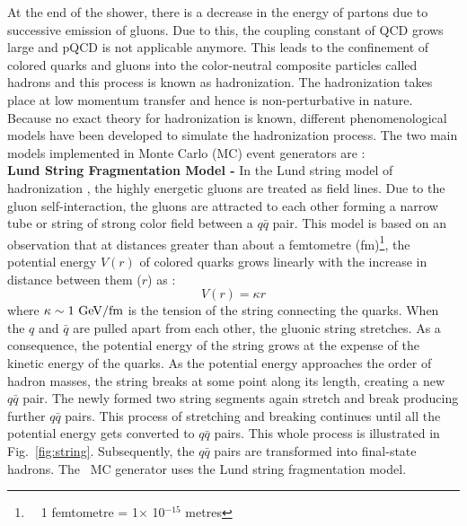 At the end of the shower, there is a decrease in the energy of partons due to successive emission of gluons. Due to this, the coupling constant of QCD \alps grows large and pQCD is not applicable anymore. This leads to the confinement of colored quarks and gluons into the color-neutral composite particles called hadrons and this process is known as hadronization. The hadronization takes place at low momentum transfer and hence is non-perturbative in nature. Because no exact theory for hadronization is known, different phenomenological models have been developed to simulate the hadronization process. The two main models implemented in Monte Carlo (MC) event generators are : \\\newline
{\bf Lund String Fragmentation Model -} In the Lund string model of hadronization \cite{Andersson:1998tv}, the highly energetic gluons are treated as field lines. Due to the gluon self-interaction, the gluons are attracted to each other forming a narrow tube or string of strong color field between a $q\bar{q}$ pair. This model is based on an observation that at distances greater than about a femtometre (fm)\footnote{~~1 femtometre = 1$\times$ 10$^{-15}$ metres}, the potential energy $V(r)$ of colored quarks grows linearly with the increase in distance between them ($r$) as :
\begin{equation}
V(r) = \kappa r
\end{equation}
where $\kappa \sim 1~{\rm GeV/fm}$ is the tension of the string connecting the quarks. When the $q$ and $\bar{q}$ are pulled apart from each other, the gluonic string stretches. As a consequence, the potential energy of the string grows at the expense of the kinetic energy of the quarks. As the potential energy approaches the order of hadron masses, the string breaks at some point along its length, creating a new $q\bar{q}$ pair. The newly formed two string segments again stretch and break producing further $q\bar{q}$ pairs. This process of stretching and breaking continues until all the potential energy gets converted to $q\bar{q}$ pairs. This whole process is illustrated in Fig.~\ref{fig:string}. Subsequently, the $q\bar{q}$ pairs are transformed into final-state hadrons. The \PYTHIA~MC generator uses the Lund string fragmentation model. 
